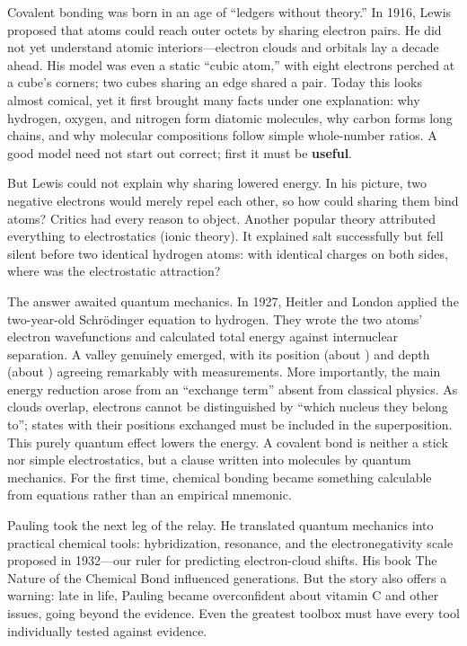 \begin{zhengju}
Covalent bonding was born in an age of ``ledgers without theory.'' In 1916, Lewis proposed that atoms could reach outer octets by sharing electron pairs. He did not yet understand atomic interiors---electron clouds and orbitals lay a decade ahead. His model was even a static ``cubic atom,'' with eight electrons perched at a cube's corners; two cubes sharing an edge shared a pair. Today this looks almost comical, yet it first brought many facts under one explanation: why hydrogen, oxygen, and nitrogen form diatomic molecules, why carbon forms long chains, and why molecular compositions follow simple whole-number ratios. A good model need not start out correct; first it must be \textbf{useful}.

But Lewis could not explain why sharing lowered energy. In his picture, two negative electrons would merely repel each other, so how could sharing them bind atoms? Critics had every reason to object. Another popular theory attributed everything to electrostatics (ionic theory). It explained salt successfully but fell silent before two identical hydrogen atoms: with identical charges on both sides, where was the electrostatic attraction?

The answer awaited quantum mechanics. In 1927, Heitler and London applied the two-year-old Schr\"odinger equation to hydrogen. They wrote the two atoms' electron wavefunctions and calculated total energy against internuclear separation. A valley genuinely emerged, with its position (about ) and depth (about ) agreeing remarkably with measurements. More importantly, the main energy reduction arose from an ``exchange term'' absent from classical physics. As clouds overlap, electrons cannot be distinguished by ``which nucleus they belong to''; states with their positions exchanged must be included in the superposition. This purely quantum effect lowers the energy. A covalent bond is neither a stick nor simple electrostatics, but a clause written into molecules by quantum mechanics. For the first time, chemical bonding became something calculable from equations rather than an empirical mnemonic.

Pauling took the next leg of the relay. He translated quantum mechanics into practical chemical tools: hybridization, resonance, and the electronegativity scale proposed in 1932---our ruler for predicting electron-cloud shifts. His book The Nature of the Chemical Bond influenced generations. But the story also offers a warning: late in life, Pauling became overconfident about vitamin C and other issues, going beyond the evidence. Even the greatest toolbox must have every tool individually tested against evidence.
\end{zhengju}

